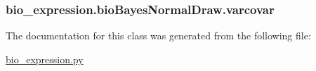 \hypertarget{classbio__expression_1_1bio_bayes_normal_draw_ae7e9d848ba62ec07f1a10e301ebfcb8a}{
\subsubsection[{varcovar}]{\setlength{\rightskip}{0pt plus 5cm}bio\+\_\+expression.\+bio\+Bayes\+Normal\+Draw.\+varcovar}}\label{classbio__expression_1_1bio_bayes_normal_draw_ae7e9d848ba62ec07f1a10e301ebfcb8a}


The documentation for this class was generated from the following file\+:\begin{DoxyCompactItemize}
\item 
\hyperlink{bio__expression_8py}{bio\+\_\+expression.\+py}\end{DoxyCompactItemize}
